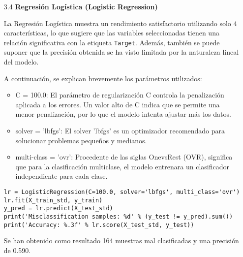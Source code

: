 \documentclass{article}
\begin{document}
\begin{itemize}

\item[3.4]  {\bf Regresi\'on Log\'istica (Logistic Regression)}

La Regresi\'on Log\'istica muestra un rendimiento satisfactorio utilizando solo 4 caracter\'isticas, lo que sugiere que las variables seleccionadas tienen una relaci\'on significativa con la etiqueta \texttt{Target}. Adem\'as, tambi\'en se puede suponer que la precisi\'on obtenida se ha visto limitada por la naturaleza lineal del modelo.

A continuaci\'on, se explican brevemente los par\'ametros utilizados:

\begin{itemize}

\item
C = 100.0: El par\'ametro de regularizaci\'on C controla la penalizaci\'on aplicada a los errores. Un valor alto de C indica que se permite una menor penalizaci\'on, por lo que el modelo intenta ajustar m\'as los datos.

\item
solver = 'lbfgs': El solver 'lbfgs' es un optimizador recomendado para solucionar problemas pequeños y medianos.

\item
multi-class = 'ovr': Procedente de las siglas OnevsRest (OVR), significa que para la
clasificaci\'on multiclase, el modelo entrenara un clasificador independiente para cada clase.

\end{itemize}

\begin{tcolorbox}[width=14cm]
\begin{scriptsize}
\begin{verbatim}
lr = LogisticRegression(C=100.0, solver='lbfgs', multi_class='ovr')
lr.fit(X_train_std, y_train)
y_pred = lr.predict(X_test_std)
print('Misclassification samples: %d' % (y_test != y_pred).sum())
print('Accuracy: %.3f' % lr.score(X_test_std, y_test))
\end{verbatim}
\end{scriptsize}
\end{tcolorbox}

Se han obtenido como resultado 164 muestras mal clasificadas y una precisi\'on de 0.590.

\end{itemize}

\bigskip
\end{document}
